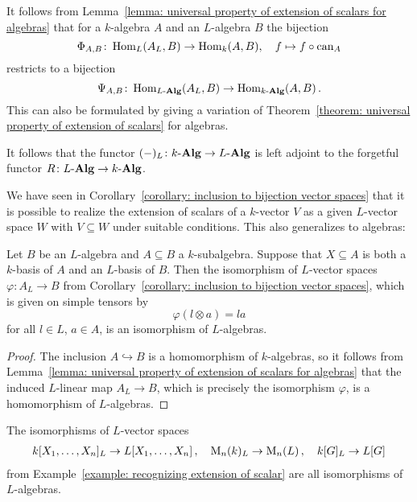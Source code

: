 \begin{remark}
  It follows from Lemma~\ref{lemma: universal property of extension of scalars for algebras} that for a $k$-algebra $A$ and an $L$-algebra $B$ the bijection
  \[
            \Phi_{A,B}
    \colon  \operatorname{Hom}_L(A_L, B)
    \to     \operatorname{Hom}_k(A, B),
    \quad   f
    \mapsto f \circ \operatorname{can}_A
  \]
  restricts to a bijection
  \[
            \Psi_{A,B}
    \colon  \operatorname{Hom}_{L\text{-}\mathbf{Alg}}(A_L, B)
    \to     \operatorname{Hom}_{k\text{-}\mathbf{Alg}}(A, B) \,.
  \]
  This can also be formulated by giving a variation of Theorem~\ref{theorem: universal property of extension of scalars} for algebras.
  
  It follows that the functor $(-)_L \colon k\text{-}\mathbf{Alg} \to L\text{-}\mathbf{Alg}$ is left adjoint to the forgetful functor $R \colon L\text{-}\mathbf{Alg} \to k\text{-}\mathbf{Alg}$.
\end{remark}


\begin{fluff}
  We have seen in Corollary~\ref{corollary: inclusion to bijection vector spaces} that it is possible to realize the extension of scalars of a $k$-vector $V$ as a given $L$-vector space $W$ with $V \subseteq W$ under suitable conditions.
  This also generalizes to algebras:
\end{fluff}


\begin{corollary}
\label{corollary: inclusion to bijection algebras}
  Let $B$ be an $L$-algebra and $A \subseteq B$ a $k$-subalgebra.
  Suppose that $X \subseteq A$ is both a $k$-basis of $A$ and an $L$-basis of $B$.
  Then the isomorphism of $L$-vector spaces $\varphi \colon A_L \to B$ from Corollary~\ref{corollary: inclusion to bijection vector spaces}, which is given on simple tensors by
  \[
      \varphi(l \otimes a)
    = l a
  \]
  for all $l \in L$, $a \in A$, is an isomorphism of $L$-algebras.
\end{corollary}
\begin{proof}
  The inclusion $A \hookrightarrow B$ is a homomorphism of $k$-algebras, so it follows from Lemma~\ref{lemma: universal property of extension of scalars for algebras} that the induced $L$-linear map $A_L \to B$, which is precisely the isomorphism $\varphi$, is a homomorphism of $L$-algebras.
\end{proof}


\begin{example}
  The isomorphisms of $L$-vector spaces
  \begin{gather*}
    k[X_1, \dotsc, X_n]_L \to L[X_1, \dotsc, X_n] \,,
    \quad
    \operatorname{M}_n(k)_L \to \operatorname{M}_n(L) \,,
    \quad
    k[G]_L \to L[G]
  \end{gather*}
  from Example~\ref{example: recognizing extension of scalar} are all isomorphisms of $L$-algebras.
\end{example}


